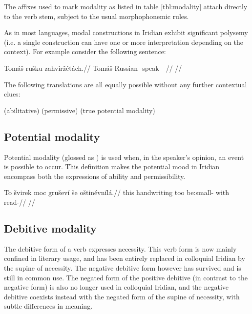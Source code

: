 The affixes used to mark modality as listed in table \ref{tbl:modality} attach directly to the verb stem, subject to the usual morphophonemic rules.

\pex\a {}
\a {}
\a {}
\a {}
\a {}
\a {}
\a {}
\xe

As in most languages, modal constructions in Iridian exhibit significant {\cscaps polysemy} (i.e. a single construction can have one or more interpretation depending on the context). For example consider the following sentence:

\pex
\begingl
\gla Tomáš rušku zahviržétách.//
\glb Tomáš Russian-\Ins{} speak-\Av{}-\Pot{}-\Ctp{}//
\glft {}//
\endgl
\xe

The following translations are all equally possible without any further contextual clues:

\pex
\a {} (abilitative)
\a {} (permissive)
\a {} (true potential modality)
\xe

\subsection{Potential modality}

Potential modality (glossed as ) is used when, in the speaker's opinion, an event is possible to occur. This definition makes the potential mood in Iridian encompass both the expressions of ability and permissibility.

\pex
\begingl
\gla To švirek moc gruševí še oštinévnílá.//
\glb this handwriting too be:small- with read-//
\glft {}//
\endgl
\xe

\subsection{Debitive modality}

The debitive form of a verb expresses necessity. This verb form is now mainly confined in literary usage, and has been entirely replaced in colloquial Iridian by the supine of necessity. The negative debitive form however has survived and is still in common use. The negated form of the positive debitive (in contrast to the negative form) is also no longer used in colloquial Iridian, and the negative debitive coexists instead with the negated form of the supine of necessity, with subtle differences in meaning.

